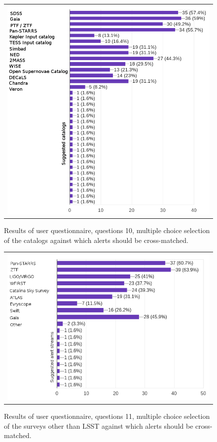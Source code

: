 \documentclass{article}
\begin{document}
\begin{figure}[ht]
\centering
\begin{tabular}{c}
\includegraphics[width=5in]{figures/user_question_10.png}
\end{tabular}
\caption{Results of user questionnaire, questions 10, multiple choice selection of the catalogs against which alerts should be cross-matched. \label{fig:Q10results}}
\label{fig:alert_content3}
\end{figure}

\begin{figure}[ht]
\centering
\begin{tabular}{c}
\includegraphics[width=5in]{figures/user_question_11.png}
\end{tabular}
\caption{Results of user questionnaire, questions 11, multiple choice selection of the surveys other than LSST against which alerts should be cross-matched. \label{fig:Q11results}}
\label{fig:alert_content4}
\end{figure}
\end{document}

